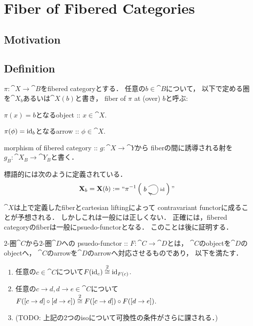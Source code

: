 \documentclass[a4paper, dvipdfmx]{jsarticle}
\newcommand{\kiso}[1][{}]{\overset{#1}{\iso}}
\begin{document}
\section{Fiber of Fibered Categories}
\subsection{Motivation}

\subsection{Definition}
\begin{Def}[Fiber]
    $\pi \colon \cat{X} \to \cat{B}$をfibered categoryとする．
    任意の$b \in \cat{B}$について，
    以下で定める圏を$\cat{X}_b$あるいは$\cat{X}(b)$と書き，
    fiber of $\pi$ at (over) $b$と呼ぶ:
    \begin{description}[labelindent=1cm]
        \item[Object.] $\pi(x)=b$となるobject :: $x \in \cat{X}$.
        \item[Arrow.] $\pi(\phi)=\id[b]$となるarrow :: $\phi \in \cat{X}$.
    \end{description}

    morphism of fibered category :: $g \colon \cat{X} \to \cat{Y}$から
    fiberの間に誘導される射を$g_B \colon \cat{X}_B \to \cat{Y}_B$と書く．
\end{Def}
\begin{Remark}
    標語的には次のように定義されている．
    \[
        \cat{X}_b=\cat{X}(b):=``
        \pi^{-1} \left(
        \vcenter{\xymatrix{
            b \ar@(ur,dr)^-{\id}
        }}
        \right)"
    \]
\end{Remark}

$\cat{X}$は上で定義したfiberとcartesian liftingによって
contravariant functorに成ることが予想される．
しかしこれは一般には正しくない．
正確には，fibered categoryのfiberは一般にpsuedo-functorとなる．
このことは後に証明する．
\begin{Def} \label{def:psuedofunctor}
    $2$-圏$\cat{C}$から$2$-圏$\cat{D}$への
    psuedo-functor :: $F \colon \cat{C} \to \cat{D}$とは，
    $\cat{C}$のobjectを$\cat{D}$のobjectへ，
    $\cat{C}$のarrowを$\cat{D}$のarrowへ対応させるものであり，
    以下を満たす．
    
    \begin{enumerate}[label=(\alph*)]
        \item 任意の$c \in \cat{C}$について$F(\id[c]) \kiso[2] \id[F(c)]$.
        \item 任意の$c \to d, d \to e \in \cat{C}$について
            $F([c \to d] \circ [d \to e]) \kiso[2] F([c \to d]) \circ F([d \to e])$.
        \item
            (TODO: 上記の$2$つのisoについて可換性の条件がさらに課される．)
    \end{enumerate}
\end{Def}
\end{document}
